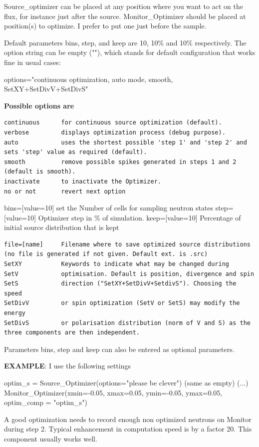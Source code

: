 Source\_optimizer can be placed at any position where you want to act on the flux, for instance just after the source. Monitor\_Optimizer should be placed at position(s) to optimize. I prefer to put one just before the sample.

Default parameters bins, step, and keep are 10, 10\% and 10\% respectively. The option string can be empty (""), which stands for default configuration that works fine in usual cases:

options="continuous optimization, auto mode, smooth, SetXY+SetDivV+SetDivS"

\textbf{Possible options are}

\begin{verbatim}
continuous      for continuous source optimization (default).
verbose         displays optimization process (debug purpose).
auto            uses the shortest possible 'step 1' and 'step 2' and sets 'step' value as required (default).
smooth          remove possible spikes generated in steps 1 and 2 (default is smooth).
inactivate      to inactivate the Optimizer.
no or not       revert next option
\end{verbatim}

bins=[value=10] set the Number of cells for sampling neutron states step=[value=10] Optimizer step in \% of simulation. keep=[value=10] Percentage of initial source distribution that is kept

\begin{verbatim}
file=[name]     Filename where to save optimized source distributions (no file is generated if not given. Default ext. is .src)
SetXY           Keywords to indicate what may be changed during
SetV            optimisation. Default is position, divergence and spin
SetS            direction ("SetXY+SetDivV+SetdivS"). Choosing the speed
SetDivV         or spin optimization (SetV or SetS) may modify the energy
SetDivS         or polarisation distribution (norm of V and S) as the three components are then independent.
\end{verbatim}

Parameters bins, step and keep can also be entered as optional parameters.

\textbf{EXAMPLE}: I use the following settings

optim\_s = Source\_Optimizer(options="please be clever") (same as empty) (...) Monitor\_Optimizer(xmin=-0.05, xmax=0.05, ymin=-0.05, ymax=0.05, optim\_comp = "optim\_s")

A good optimization needs to record enough non optimized neutrons on Monitor during step 2. Typical enhancement in computation speed is by a factor 20. This component usually works well.

